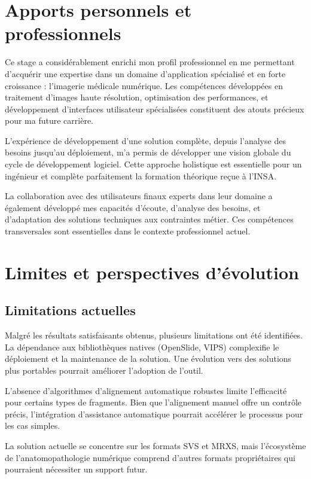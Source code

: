 \documentclass[12pt,a4paper]{report}
\begin{document}
\section{Apports personnels et professionnels}

Ce stage a considérablement enrichi mon profil professionnel en me permettant d'acquérir une expertise dans un domaine d'application spécialisé et en forte croissance : l'imagerie médicale numérique. Les compétences développées en traitement d'images haute résolution, optimisation des performances, et développement d'interfaces utilisateur spécialisées constituent des atouts précieux pour ma future carrière.

L'expérience de développement d'une solution complète, depuis l'analyse des besoins jusqu'au déploiement, m'a permis de développer une vision globale du cycle de développement logiciel. Cette approche holistique est essentielle pour un ingénieur et complète parfaitement la formation théorique reçue à l'INSA.

La collaboration avec des utilisateurs finaux experts dans leur domaine a également développé mes capacités d'écoute, d'analyse des besoins, et d'adaptation des solutions techniques aux contraintes métier. Ces compétences transversales sont essentielles dans le contexte professionnel actuel.

\section{Limites et perspectives d'évolution}

\subsection{Limitations actuelles}

Malgré les résultats satisfaisants obtenus, plusieurs limitations ont été identifiées. La dépendance aux bibliothèques natives (OpenSlide, VIPS) complexifie le déploiement et la maintenance de la solution. Une évolution vers des solutions plus portables pourrait améliorer l'adoption de l'outil.

L'absence d'algorithmes d'alignement automatique robustes limite l'efficacité pour certains types de fragments. Bien que l'alignement manuel offre un contrôle précis, l'intégration d'assistance automatique pourrait accélérer le processus pour les cas simples.

La solution actuelle se concentre sur les formats SVS et MRXS, mais l'écosystème de l'anatomopathologie numérique comprend d'autres formats propriétaires qui pourraient nécessiter un support futur.
\end{document}
